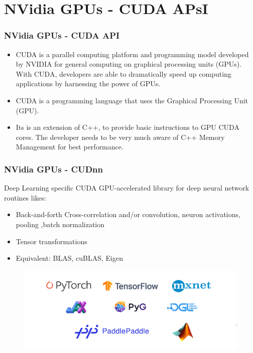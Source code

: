 \documentclass[11pt]{beamer}
\begin{document}
\section{NVidia GPUs - CUDA APsI}
\begin{frame}
	\frametitle{NVidia GPUs - CUDA API}
	\begin{center}
\begin{itemize}
	\item CUDA is a parallel computing platform and programming model developed by NVIDIA for general computing on graphical processing units (GPUs). With CUDA, developers are able to dramatically speed up computing applications by harnessing the power of GPUs.
	\item CUDA is a programming language that uses the Graphical Processing Unit (GPU). 
	\item Its is an extension of C++, to provide basic instructions to GPU CUDA cores. The developer needs to be very much aware of C++ Memory Management for best performance.
\end{itemize}
	\end{center}
\end{frame}

\begin{frame}
	\frametitle{NVidia GPUs - CUDnn}
	Deep Learning specific CUDA GPU-accelerated library for  deep neural network routines likes:
	\begin{center}
		\begin{itemize}
			\item Back-and-forth Cross-correlation and/or convolution, neuron activations, pooling ,batch normalization
			\item Tensor transformations
			\item Equivalent: BLAS, cuBLAS, Eigen
		\end{itemize}
	\begin{figure}
	\includegraphics[width=\textwidth,height=\textheight,keepaspectratio]{dl_logos_wide_002}
\end{figure}
	\end{center}
\end{frame}
\end{document}
